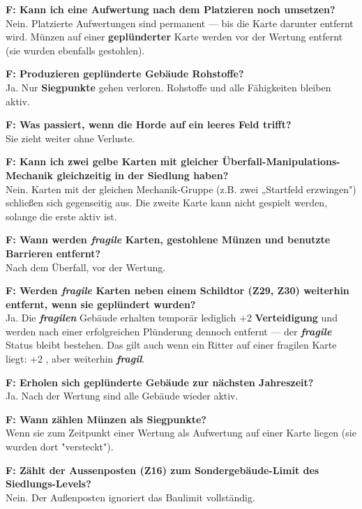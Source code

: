 \documentclass[11pt]{article}
\begin{document}
\begin{lumenpage}
{\textbf{F: Kann ich eine Aufwertung nach dem Platzieren noch umsetzen?}\\
Nein. Platzierte Aufwertungen sind permanent --- bis die Karte darunter entfernt wird. Münzen auf einer \lumenPlundered\textbf{ geplünderter} Karte werden vor der Wertung entfernt (sie wurden ebenfalls gestohlen).

\textbf{F: Produzieren \lumenPlundered\textbf{ geplünderte} Gebäude Rohstoffe?}\\
Ja. Nur \lumenVP\textbf{ Siegpunkte} gehen verloren. Rohstoffe und alle Fähigkeiten bleiben aktiv.

\textbf{F: Was passiert, wenn die Horde auf ein leeres Feld trifft?}\\
Sie zieht weiter ohne Verluste.

\textbf{F: Kann ich zwei gelbe Karten mit gleicher Überfall-Manipulations-Mechanik gleichzeitig in der Siedlung haben?}\\
Nein. Karten mit der gleichen Mechanik-Gruppe (z.B. zwei „Startfeld erzwingen") schließen sich gegenseitig aus. Die zweite Karte kann nicht gespielt werden, solange die erste aktiv ist.

\textbf{F: Wann werden \textcolor{LumenGold}{\textbf{\textit{fragile}}} Karten, gestohlene Münzen und benutzte Barrieren entfernt?}\\
Nach dem Überfall, vor der Wertung.

\textbf{F: Werden \textcolor{LumenGold}{\textbf{\textit{fragile}}} Karten neben einem Schildtor (Z29, Z30) weiterhin entfernt, wenn sie \lumenPlundered\textbf{ geplündert} wurden?}\\
Ja. Die \textcolor{LumenGold}{\textbf{\textit{fragilen}}} Gebäude erhalten temporär lediglich +2 \lumenDef\textbf{ Verteidigung} und werden nach einer erfolgreichen Plünderung dennoch entfernt — der \textcolor{LumenGold}{\textbf{\textit{fragile}}} Status bleibt bestehen. Das gilt auch wenn ein Ritter auf einer fragilen Karte liegt: +2 \lumenDef\textbf{}, aber weiterhin \textcolor{LumenGold}{\textbf{\textit{fragil}}}.

\textbf{F: Erholen sich \lumenPlundered\textbf{ geplünderte} Gebäude zur nächsten Jahreszeit?}\\
Ja. Nach der Wertung sind alle Gebäude wieder aktiv.

\textbf{F: Wann zählen Münzen als \lumenVP\textbf{ Siegpunkte}?}\\
Wenn sie zum Zeitpunkt einer Wertung als Aufwertung auf einer Karte liegen (sie wurden dort "versteckt").

\textbf{F: Zählt der Aussenposten (Z16) zum Sondergebäude-Limit des Siedlungs-Levels?}\\
Nein. Der Außenposten ignoriert das Baulimit vollständig.

} %

\lumenwidebreak
\lumenwideresume

\end{lumenpage}
\end{document}
